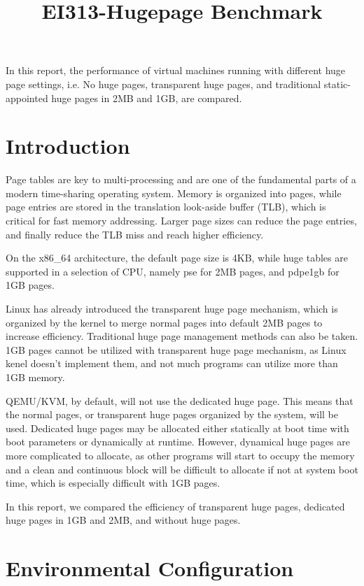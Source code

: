 \documentclass[12pt]{article}
\title{EI313-Hugepage Benchmark}
\begin{document}
\maketitle

In this report, the performance of virtual machines running with different huge page settings, i.e. No huge pages, transparent huge pages, and traditional static-appointed huge pages in 2MB and 1GB, are compared.

\section{Introduction}

Page tables are key to multi-processing and are one of the fundamental parts of a modern time-sharing operating system. Memory is organized into pages, while page entries are stored in the translation look-aside buffer (TLB), which is critical for fast memory addressing. Larger page sizes can reduce the page entries, and finally reduce the TLB miss and reach higher efficiency.

On the x86\_64 architecture, the default page size is 4KB, while huge tables are supported in a selection of CPU, namely pse for 2MB pages, and pdpe1gb for 1GB pages.

Linux has already introduced the transparent huge page mechanism, which is organized by the kernel to merge normal pages into default 2MB pages to increase efficiency. Traditional huge page management methods can also be taken. 1GB pages cannot be utilized with transparent huge page mechanism, as Linux kenel doesn’t implement them, and not much programs can utilize more than 1GB memory.

QEMU/KVM, by default, will not use the dedicated huge page. This means that the normal pages, or transparent huge pages organized by the system, will be used. Dedicated huge pages may be allocated either statically at boot time with boot parameters or dynamically at runtime. However, dynamical huge pages are more complicated to allocate, as other programs will start to occupy the memory and a clean and continuous block will be difficult to allocate if not at system boot time, which is especially difficult with 1GB pages.

In this report, we compared the efficiency of transparent huge pages, dedicated huge pages in 1GB and 2MB, and without huge pages.

\section{Environmental Configuration}
\end{document}
